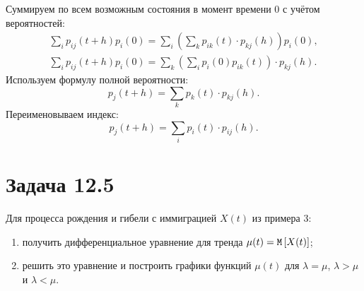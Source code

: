 \documentclass[12pt]{article}
\begin{document}
    Суммируем по всем возможным состояния в момент времени 0 с учётом вероятностей:
    \begin{gather*}
        \sum_i p_{ij}(t+h) p_i(0) = \sum_i \left ( \sum_k p_{ik}(t) \cdot p_{kj}(h) \right ) p_i(0) , \\
        \sum_i p_{ij}(t+h) p_i(0) = \sum_k \left ( \sum_i p_i(0) p_{ik}(t) \right ) \cdot p_{kj}(h).
    \end{gather*}
    Используем формулу полной вероятности:
    \[
        p_j(t+h) = \sum_k p_k(t) \cdot p_{kj}(h) .
    \]
    Переименовываем индекс:
    \[
        p_j(t+h) = \sum_i p_i(t) \cdot p_{ij}(h) .
    \]

    \section*{Задача 12.5}
    Для процесса рождения и гибели с иммиграцией $X(t)$ из примера 3:
    \begin{enumerate}
        \item получить дифференциальное уравнение для тренда $\mu(t) = \mathtt{M} \left [ X(t) \right ]$;
        \item решить это уравнение и построить графики функций $\mu(t)$ для $\lambda = \mu$, $\lambda > \mu$ и $\lambda < \mu$.
    \end{enumerate}
\end{document}
